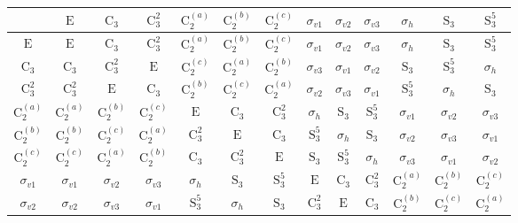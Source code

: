 \begin{tabular}{c|cccccccccccc}
\toprule
 & $\mathrm{E}$ & $\mathrm{C}_{3}$ & $\mathrm{C}_{3}^{2}$ & $\mathrm{C}_{2}^{(a)}$ & $\mathrm{C}_{2}^{(b)}$ & $\mathrm{C}_{2}^{(c)}$ & $\sigma_{v1}$ & $\sigma_{v2}$ & $\sigma_{v3}$ & $\sigma_{h}$ & $\mathrm{S}_{3}$ & $\mathrm{S}_{3}^{5}$ \\
\midrule
$\mathrm{E}$ & $\mathrm{E}$ & $\mathrm{C}_{3}$ & $\mathrm{C}_{3}^{2}$ & $\mathrm{C}_{2}^{(a)}$ & $\mathrm{C}_{2}^{(b)}$ & $\mathrm{C}_{2}^{(c)}$ & $\sigma_{v1}$ & $\sigma_{v2}$ & $\sigma_{v3}$ & $\sigma_{h}$ & $\mathrm{S}_{3}$ & $\mathrm{S}_{3}^{5}$ \\
$\mathrm{C}_{3}$ & $\mathrm{C}_{3}$ & $\mathrm{C}_{3}^{2}$ & $\mathrm{E}$ & $\mathrm{C}_{2}^{(c)}$ & $\mathrm{C}_{2}^{(a)}$ & $\mathrm{C}_{2}^{(b)}$ & $\sigma_{v3}$ & $\sigma_{v1}$ & $\sigma_{v2}$ & $\mathrm{S}_{3}$ & $\mathrm{S}_{3}^{5}$ & $\sigma_{h}$ \\
$\mathrm{C}_{3}^{2}$ & $\mathrm{C}_{3}^{2}$ & $\mathrm{E}$ & $\mathrm{C}_{3}$ & $\mathrm{C}_{2}^{(b)}$ & $\mathrm{C}_{2}^{(c)}$ & $\mathrm{C}_{2}^{(a)}$ & $\sigma_{v2}$ & $\sigma_{v3}$ & $\sigma_{v1}$ & $\mathrm{S}_{3}^{5}$ & $\sigma_{h}$ & $\mathrm{S}_{3}$ \\
$\mathrm{C}_{2}^{(a)}$ & $\mathrm{C}_{2}^{(a)}$ & $\mathrm{C}_{2}^{(b)}$ & $\mathrm{C}_{2}^{(c)}$ & $\mathrm{E}$ & $\mathrm{C}_{3}$ & $\mathrm{C}_{3}^{2}$ & $\sigma_{h}$ & $\mathrm{S}_{3}$ & $\mathrm{S}_{3}^{5}$ & $\sigma_{v1}$ & $\sigma_{v2}$ & $\sigma_{v3}$ \\
$\mathrm{C}_{2}^{(b)}$ & $\mathrm{C}_{2}^{(b)}$ & $\mathrm{C}_{2}^{(c)}$ & $\mathrm{C}_{2}^{(a)}$ & $\mathrm{C}_{3}^{2}$ & $\mathrm{E}$ & $\mathrm{C}_{3}$ & $\mathrm{S}_{3}^{5}$ & $\sigma_{h}$ & $\mathrm{S}_{3}$ & $\sigma_{v2}$ & $\sigma_{v3}$ & $\sigma_{v1}$ \\
$\mathrm{C}_{2}^{(c)}$ & $\mathrm{C}_{2}^{(c)}$ & $\mathrm{C}_{2}^{(a)}$ & $\mathrm{C}_{2}^{(b)}$ & $\mathrm{C}_{3}$ & $\mathrm{C}_{3}^{2}$ & $\mathrm{E}$ & $\mathrm{S}_{3}$ & $\mathrm{S}_{3}^{5}$ & $\sigma_{h}$ & $\sigma_{v3}$ & $\sigma_{v1}$ & $\sigma_{v2}$ \\
$\sigma_{v1}$ & $\sigma_{v1}$ & $\sigma_{v2}$ & $\sigma_{v3}$ & $\sigma_{h}$ & $\mathrm{S}_{3}$ & $\mathrm{S}_{3}^{5}$ & $\mathrm{E}$ & $\mathrm{C}_{3}$ & $\mathrm{C}_{3}^{2}$ & $\mathrm{C}_{2}^{(a)}$ & $\mathrm{C}_{2}^{(b)}$ & $\mathrm{C}_{2}^{(c)}$ \\
$\sigma_{v2}$ & $\sigma_{v2}$ & $\sigma_{v3}$ & $\sigma_{v1}$ & $\mathrm{S}_{3}^{5}$ & $\sigma_{h}$ & $\mathrm{S}_{3}$ & $\mathrm{C}_{3}^{2}$ & $\mathrm{E}$ & $\mathrm{C}_{3}$ & $\mathrm{C}_{2}^{(b)}$ & $\mathrm{C}_{2}^{(c)}$ & $\mathrm{C}_{2}^{(a)}$ \\

\end{tabular}
